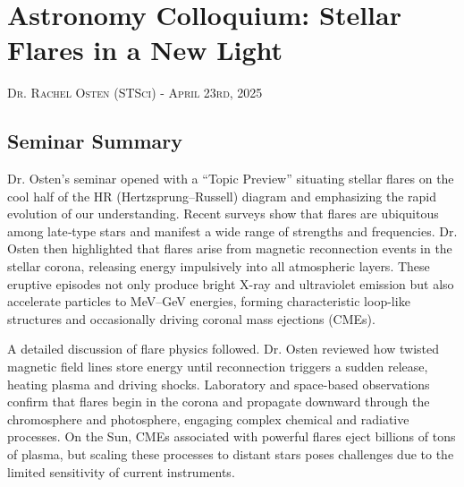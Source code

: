 

%
%

\newcommand{\hmwkTitle}{Extra Credit 01}
\newcommand{\hmwkSubTitle}{Technical Seminar}
\newcommand{\hmwkDueDate}{May 01st, 2025}
\newcommand{\hmwkDueTime}{09:30 AM}
\newcommand{\hmwkClass}{ENAE 404 - 0101}
\newcommand{\hmwkClassTime}{09:30 AM}
\newcommand{\hmwkClassInstructor}{Dr. Barbee}
\newcommand{\hmwkAuthorName}{\textbf{Vai Srivastava}}
\newcommand{\hmwkCompletionDate}{\today}



\maketitle

\pagebreak

\section*{Astronomy Colloquium: Stellar Flares in a New Light}
\textsc{\large Dr. Rachel Osten (STSci) - April 23rd, 2025}

\subsection*{Seminar Summary}

Dr. Osten's seminar opened with a “Topic Preview” situating stellar flares on the cool half of the HR (Hertzsprung–Russell) diagram and emphasizing the rapid evolution of our understanding. Recent surveys show that flares are ubiquitous among late‐type stars and manifest a wide range of strengths and frequencies. Dr. Osten then highlighted that flares arise from magnetic reconnection events in the stellar corona, releasing energy impulsively into all atmospheric layers. These eruptive episodes not only produce bright X-ray and ultraviolet emission but also accelerate particles to MeV–GeV energies, forming characteristic loop-like structures and occasionally driving coronal mass ejections (CMEs).

A detailed discussion of flare physics followed. Dr. Osten reviewed how twisted magnetic field lines store energy until reconnection triggers a sudden release, heating plasma and driving shocks. Laboratory and space-based observations confirm that flares begin in the corona and propagate downward through the chromosphere and photosphere, engaging complex chemical and radiative processes. On the Sun, CMEs associated with powerful flares eject billions of tons of plasma, but scaling these processes to distant stars poses challenges due to the limited sensitivity of current instruments.

